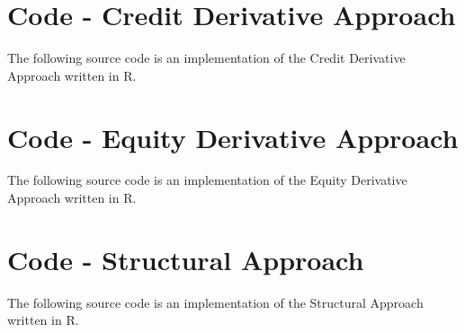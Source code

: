 \chapter{Code - Credit Derivative Approach}

The following source code is an implementation of the Credit Derivative Approach written in R.
 



\chapter{Code - Equity Derivative Approach}

The following source code is an implementation of the Equity Derivative Approach written in R.
 


\chapter{Code - Structural Approach}

The following source code is an implementation of the Structural Approach written in R.
 




